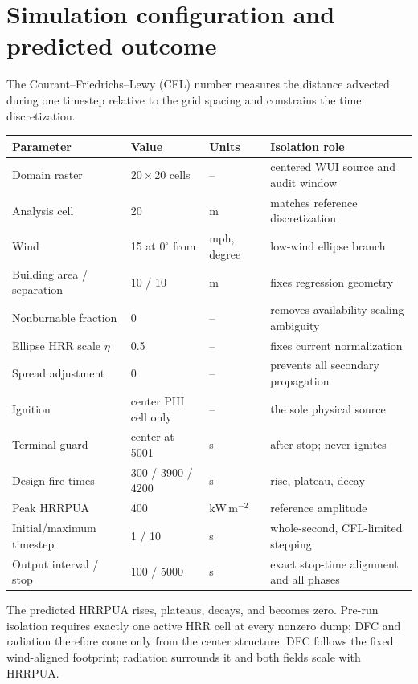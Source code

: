 \section{Simulation configuration and predicted outcome}

The Courant--Friedrichs--Lewy (CFL) number measures the distance
advected during one timestep relative to the grid spacing and
constrains the time discretization.

\begin{center}
\small
\begin{tabular}{@{}llll@{}}\toprule
Parameter & Value & Units & Isolation role\\\midrule
Domain raster & \(20\times20\) cells & -- & centered WUI source and audit window\\
Analysis cell & 20 & m & matches reference discretization\\
Wind & 15 at \(0^\circ\) from & mph, degree & low-wind ellipse branch\\
Building area / separation & 10 / 10 & m & fixes regression geometry\\
Nonburnable fraction & 0 & -- & removes availability scaling ambiguity\\
Ellipse HRR scale \(\eta\) & 0.5 & -- & fixes current normalization\\
Spread adjustment & 0 & -- & prevents all secondary propagation\\
Ignition & center PHI cell only & -- & the sole physical source\\
Terminal guard & center at 5001 & s & after stop; never ignites\\
Design-fire times & 300 / 3900 / 4200 & s & rise, plateau, decay\\
Peak HRRPUA & 400 & \(\mathrm{kW\,m^{-2}}\) & reference amplitude\\
Initial/maximum timestep & 1 / 10 & s & whole-second, CFL-limited stepping\\
Output interval / stop & 100 / 5000 & s & exact stop-time alignment and all phases\\
\bottomrule\end{tabular}
\end{center}
The predicted HRRPUA rises, plateaus, decays, and becomes zero. Pre-run isolation requires exactly one active HRR cell at every nonzero dump; DFC and radiation therefore come only from the center structure. DFC follows the fixed wind-aligned footprint; radiation surrounds it and both fields scale with HRRPUA.

